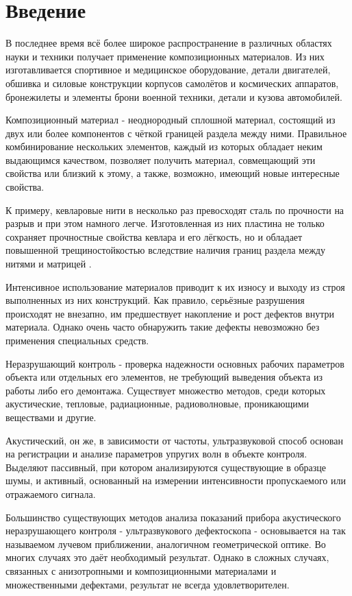 \section*{Введение}
В последнее время всё более широкое распространение в различных областях науки и техники получает применение композиционных материалов. 
Из них изготавливается спортивное и медицинское оборудование, детали двигателей, обшивка и силовые конструкции корпусов самолётов и космических аппаратов, 
бронежилеты и элементы брони военной техники, детали и кузова автомобилей.

Композиционный материал - неоднородный сплошной материал, состоящий из двух или более компонентов с чёткой границей раздела между ними.
Правильное комбинирование нескольких элементов, каждый из которых обладает неким выдающимся качеством, позволяет получить материал, 
совмещающий эти свойства или близкий к этому, а также, возможно, имеющий новые интересные свойства.

К примеру, кевларовые нити в несколько раз превосходят сталь по прочности на разрыв и при этом намного легче. Изготовленная из них пластина не только 
сохраняет прочностные свойства кевлара и его лёгкость, но и обладает повышенной трещиностойкостью вследствие наличия границ раздела между нитями и матрицей \cite{resler}.

Интенсивное использование материалов приводит к их износу и выходу из строя выполненных из них конструкций. Как правило, серьёзные разрушения происходят не
внезапно, им предшествует накопление и рост дефектов внутри материала. Однако очень часто обнаружить такие дефекты невозможно без применения специальных
средств. 

Неразрушающий контроль - проверка надежности основных рабочих параметров объекта или отдельных его элементов, не требующий выведения объекта из работы либо его демонтажа.
Существует множество методов, среди которых акустические, тепловые, радиационные, радиоволновые, проникающими веществами и другие.

Акустический, он же, в зависимости от частоты, ультразвуковой способ основан на регистрации и анализе параметров упругих волн в объекте контроля. Выделяют пассивный, при котором анализируются существующие в образце шумы, и активный, основанный на измерении интенсивности пропускаемого или отражаемого сигнала.

Большинство существующих методов анализа показаний прибора акустического неразрушающего контроля - ультразвукового дефектоскопа - основывается на так называемом лучевом приближении, аналогичном геометрической оптике. Во многих случаях это даёт необходимый результат. Однако в сложных случаях, связанных с анизотропными и композиционными  материалами и  множественными дефектами, результат не всегда удовлетворителен.

